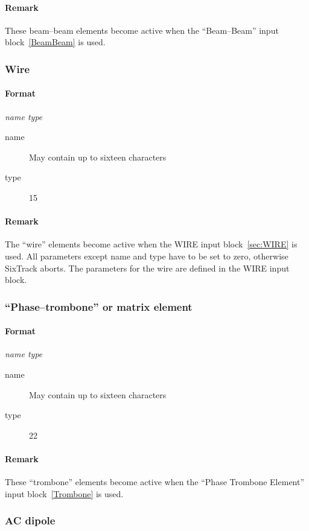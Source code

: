 \documentclass[a4paper,11pt]{report}
\begin{document}
\paragraph{Remark}
These beam--beam elements become active when the ``Beam--Beam'' input
block~\ref{BeamBeam} is used.

\subsubsection{Wire} \label{WIRE}
\paragraph{Format} {\em name type}
\begin{description}
	\item [name] May contain up to sixteen characters
	\item [type] 15
\end{description}

\paragraph{Remark}
The ``wire'' elements become active when the
WIRE input block~\ref{sec:WIRE} is used. All parameters except name and type have to be set to zero, otherwise SixTrack aborts. The parameters for the wire are defined in the WIRE input block.

\subsubsection{``Phase--trombone'' or matrix element} \label{PT}
\paragraph{Format} {\em name type}
\begin{description}
\item [name] May contain up to sixteen characters
\item [type] 22
\end{description}

\paragraph{Remark}
These ``trombone'' elements become active when the
``Phase Trombone Element'' input block~\ref{Trombone} is used.

\subsubsection{AC dipole} \label{ACDIP}
\end{document}
